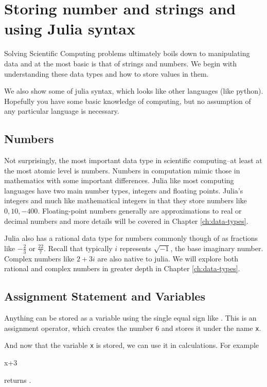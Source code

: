 
\hypertarget{ch:variables}{%
\chapter{Storing number and strings and using Julia syntax}\label{ch:variables}}

Solving Scientific Computing problems ultimately boils down to manipulating data and at the most basic is that of strings and numbers.  We begin with understanding these data types and how to store values in them. 

We also show some of julia syntax, which looks like other languages (like python).  Hopefully you have some basic knowledge of computing, but no assumption of any particular language is necessary. 

\section{Numbers}

Not surprisingly, the most important data type in scientific computing--at least at the most atomic level is numbers.  Numbers in computation mimic those in mathematics with some important differences.  Julia like most computing languages have two main number types, integers and floating points.  Julia's integers and much like mathematical integers in that they store numbers like $0, 10, -400$.  Floating-point numbers generally are approximations to real or decimal numbers and more details will be covered in Chapter \ref{ch:data-types}.  

Julia also has a rational data type for numbers commonly though of as fractions like $-\frac{2}{3}$ or $\frac{22}{7}$.  Recall that typically $i$ represents $\sqrt{-1}$, the base imaginary number.  Complex numbers like $2+3i$ are also native to julia.  We will explore both rational and complex numbers in greater depth in Chapter \ref{ch:data-types}.

\section{Assignment Statement and Variables}

Anything can be stored as a variable using the single equal sign like
. This is an assignment operator, which creates the number 6
and stores it under the name \texttt{x}.  

And now that the variable \verb!x! is stored, we can use it in calculations.  For example
\begin{jlblock}[vars]
x+3
\end{jlblock}
%
returns \printpythontex[verb]. 

